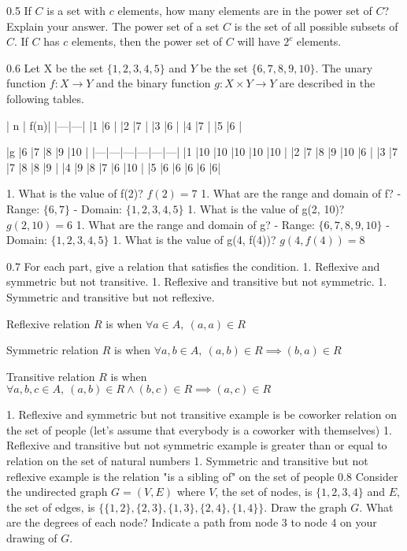 \documentclass[12pt, a4paper]{article}
\begin{document}
0.5
If $C$ is a set with $c$ elements, how many elements are in the power set of $C$? 
Explain your answer.
The power set of a set $C$ is the set of all possible subsets of $C$. If $C$ has $c$ elements, then the power set of $C$ will have $2^c$ elements.

0.6
Let X be the set $\{1, 2, 3, 4, 5\}$ and $Y$ be the set $\{6, 7, 8, 9, 10\}$. The unary function $f: X \to Y$ and the binary function $g: X \times Y \to Y$ are described in the following tables.

| n | f(n)| 
|---|---|
|1 |6 |
|2 |7 |
|3 |6 |
|4 |7 |
|5 |6 |

|g |6 |7 |8 |9 |10 |
|---|---|---|---|---|---|
|1 |10 |10 |10 |10 |10 |
|2 |7 |8 |9 |10 |6 |
|3 |7 |7 |8 |8 |9 |
|4 |9 |8 |7 |6 |10 |
|5 |6 |6 |6 |6 |6|

1. What is the value of f(2)? 
    $f(2) = 7$
1. What are the range and domain of f?
    - Range: $\{6, 7\}$
    - Domain: $\{1, 2, 3, 4, 5\}$
1. What is the value of g(2, 10)?
    $g(2, 10) = 6$
1. What are the range and domain of g?
    - Range: $\{6, 7, 8, 9, 10\}$
    - Domain: $\{1, 2, 3, 4, 5\}$
1. What is the value of g(4, f(4))?
    $g(4, f(4)) = 8$

0.7
For each part, give a relation that satisfies the condition.
1. Reflexive and symmetric but not transitive.
1. Reflexive and transitive but not symmetric.
1. Symmetric and transitive but not reflexive.

Reflexive relation $R$ is when $\forall a \in A, \ (a, a) \in R$

Symmetric relation $R$ is when $\forall a, b \in A, \ (a, b) \in R \implies (b, a) \in R$

Transitive relation $R$ is when $\forall a, b, c \in A, \ (a, b) \in R \land (b, c) \in R \implies (a, c) \in R$

1. Reflexive and symmetric but not transitive example is be coworker relation on the set of people (let's assume that everybody is a coworker with themselves)
1. Reflexive and transitive but not symmetric example is greater than or equal to relation on the set of natural numbers
1. Symmetric and transitive but not reflexive example is the relation "is a sibling of" on the set of people
0.8
Consider the undirected graph $G = (V, E)$ where $V$, the set of nodes, is $\{1, 2, 3, 4\}$ and $E$, the set of edges, is $\{\{1, 2\}, \{2, 3\}, \{1, 3\}, \{2, 4\}, \{1, 4\}\}$. Draw the graph $G$. What are the degrees of each node? Indicate a path from node 3 to node 4 on your drawing of $G$.
\end{document}

